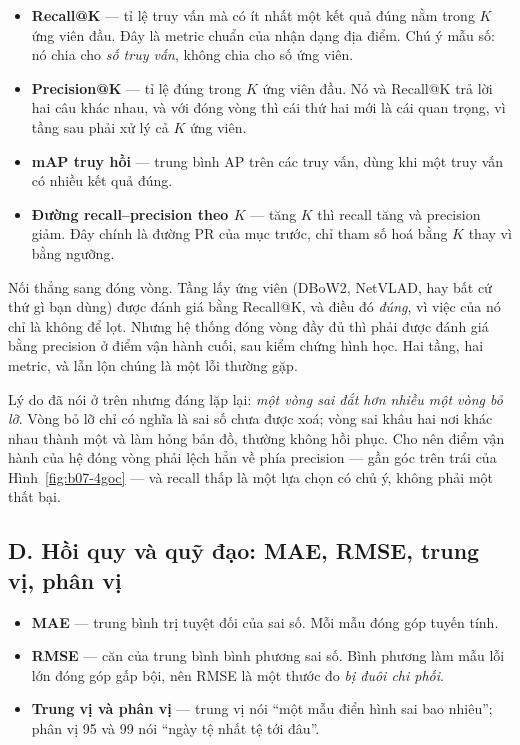 \documentclass[../../deep_learning.tex]{subfiles}
\begin{document}
\begin{itemize}
\item \textbf{Recall@K} --- tỉ lệ truy vấn mà có ít nhất một kết quả đúng nằm trong \(K\) ứng viên đầu. Đây là metric chuẩn của nhận dạng địa điểm. Chú ý mẫu số: nó chia cho \emph{số truy vấn}, không chia cho số ứng viên.
\item \textbf{Precision@K} --- tỉ lệ đúng trong \(K\) ứng viên đầu. Nó và Recall@K trả lời hai câu khác nhau, và với đóng vòng thì cái thứ hai mới là cái quan trọng, vì tầng sau phải xử lý cả \(K\) ứng viên.
\item \textbf{mAP truy hồi} --- trung bình AP trên các truy vấn, dùng khi một truy vấn có nhiều kết quả đúng.
\item \textbf{Đường recall--precision theo \(K\)} --- tăng \(K\) thì recall tăng và precision giảm. Đây chính là đường PR của mục trước, chỉ tham số hoá bằng \(K\) thay vì bằng ngưỡng.
\end{itemize}

Nối thẳng sang đóng vòng. Tầng lấy ứng viên (DBoW2, NetVLAD, hay bất cứ thứ gì bạn dùng) được đánh giá bằng Recall@K, và điều đó \emph{đúng}, vì việc của nó chỉ là không để lọt. Nhưng hệ thống đóng vòng đầy đủ thì phải được đánh giá bằng precision ở điểm vận hành cuối, sau kiểm chứng hình học. Hai tầng, hai metric, và lẫn lộn chúng là một lỗi thường gặp.

Lý do đã nói ở trên nhưng đáng lặp lại: \emph{một vòng sai đắt hơn nhiều một vòng bỏ lỡ}. Vòng bỏ lỡ chỉ có nghĩa là sai số chưa được xoá; vòng sai khâu hai nơi khác nhau thành một và làm hỏng bản đồ, thường không hồi phục. Cho nên điểm vận hành của hệ đóng vòng phải lệch hẳn về phía precision --- gần góc trên trái của Hình~\ref{fig:b07-4goc} --- và recall thấp là một lựa chọn có chủ ý, không phải một thất bại.

\subsection{D. Hồi quy và quỹ đạo: MAE, RMSE, trung vị, phân vị}
\begin{itemize}
\item \textbf{MAE} --- trung bình trị tuyệt đối của sai số. Mỗi mẫu đóng góp tuyến tính.
\item \textbf{RMSE} --- căn của trung bình bình phương sai số. Bình phương làm mẫu lỗi lớn đóng góp gấp bội, nên RMSE là một thước đo \emph{bị đuôi chi phối}.
\item \textbf{Trung vị và phân vị} --- trung vị nói ``một mẫu điển hình sai bao nhiêu''; phân vị 95 và 99 nói ``ngày tệ nhất tệ tới đâu''.
\end{itemize}
\end{document}

